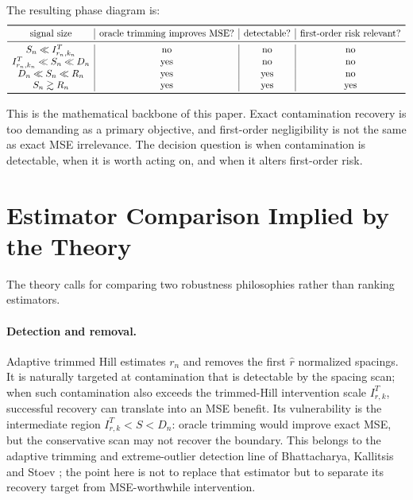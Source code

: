 \documentclass[11pt]{article}
\begin{document}
The resulting phase diagram is:
\[
\begin{array}{c|c|c|c}
\toprule
\hbox{signal size} &
\hbox{oracle trimming improves MSE?} &
\hbox{detectable?} &
\hbox{first-order risk relevant?}\\
\midrule
S_n\ll I^{T}_{r_n,k_n} & \hbox{no} & \hbox{no} & \hbox{no}\\
I^{T}_{r_n,k_n}\ll S_n\ll D_n & \hbox{yes} & \hbox{no} & \hbox{no}\\
D_n\ll S_n\ll R_n & \hbox{yes} & \hbox{yes} & \hbox{no}\\
S_n\gtrsim R_n & \hbox{yes} & \hbox{yes} & \hbox{yes}\\
\bottomrule
\end{array}
\]

This is the mathematical backbone of this paper.  Exact contamination
recovery is too demanding as a primary objective, and first-order
negligibility is not the same as exact MSE irrelevance.  The decision question
is when contamination is detectable, when it is worth acting on, and when it
alters first-order risk.

\section{Estimator Comparison Implied by the Theory}
\label{sec:estimator-comparison}

The theory calls for comparing two robustness philosophies rather than ranking
estimators.

\paragraph{Detection and removal.}
Adaptive trimmed Hill estimates $r_n$ and removes the first $\widehat r$
normalized spacings.  It is naturally targeted at contamination that is
detectable by the spacing scan; when such contamination also exceeds the
trimmed-Hill intervention scale $I^{T}_{r,k}$, successful recovery can
translate into an MSE benefit.  Its
vulnerability is the intermediate region $I^{T}_{r,k}<S<D_n$: oracle trimming would
improve exact MSE, but the conservative scan may not recover the boundary.  This
belongs to the adaptive
trimming and extreme-outlier detection line of Bhattacharya, Kallitsis and
Stoev \citeyearpar{bhattacharya-kallitsis-stoev-2019}; the point here is not to
replace that estimator but to separate its recovery target from MSE-worthwhile
intervention.
\end{document}
